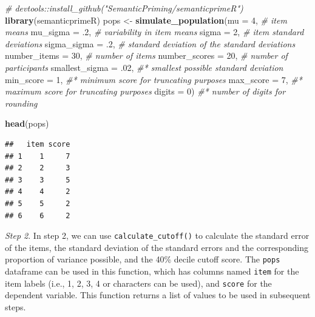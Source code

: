 \documentclass[
  man]{apa7}
\newenvironment{Shaded}{\begin{snugshade}}{\end{snugshade}}
\newcommand{\AttributeTok}[1]{\textcolor[rgb]{0.13,0.29,0.53}{#1}}
\newcommand{\CommentTok}[1]{\textcolor[rgb]{0.56,0.35,0.01}{\textit{#1}}}
\newcommand{\DecValTok}[1]{\textcolor[rgb]{0.00,0.00,0.81}{#1}}
\newcommand{\FunctionTok}[1]{\textcolor[rgb]{0.13,0.29,0.53}{\textbf{#1}}}
\newcommand{\NormalTok}[1]{#1}
\newcommand{\OtherTok}[1]{\textcolor[rgb]{0.56,0.35,0.01}{#1}}
\begin{document}
\begin{Shaded}
\begin{Highlighting}[]
\CommentTok{\# devtools::install\_github("SemanticPriming/semanticprimeR")}
\FunctionTok{library}\NormalTok{(semanticprimeR)}
\NormalTok{pops }\OtherTok{\textless{}{-}} \FunctionTok{simulate\_population}\NormalTok{(}\AttributeTok{mu =} \DecValTok{4}\NormalTok{, }\CommentTok{\# item means}
  \AttributeTok{mu\_sigma =}\NormalTok{ .}\DecValTok{2}\NormalTok{, }\CommentTok{\# variability in item means }
  \AttributeTok{sigma =} \DecValTok{2}\NormalTok{, }\CommentTok{\# item standard deviations}
  \AttributeTok{sigma\_sigma =}\NormalTok{ .}\DecValTok{2}\NormalTok{, }\CommentTok{\# standard deviation of the standard deviations}
  \AttributeTok{number\_items =} \DecValTok{30}\NormalTok{, }\CommentTok{\# number of items}
  \AttributeTok{number\_scores =} \DecValTok{20}\NormalTok{, }\CommentTok{\# number of participants}
  \AttributeTok{smallest\_sigma =}\NormalTok{ .}\DecValTok{02}\NormalTok{, }\CommentTok{\#* smallest possible standard deviation}
  \AttributeTok{min\_score =} \DecValTok{1}\NormalTok{, }\CommentTok{\#* minimum score for truncating purposes}
  \AttributeTok{max\_score =} \DecValTok{7}\NormalTok{, }\CommentTok{\#* maximum score for truncating purposes}
  \AttributeTok{digits =} \DecValTok{0}\NormalTok{) }\CommentTok{\#* number of digits for rounding}
  
\FunctionTok{head}\NormalTok{(pops)}
\end{Highlighting}
\end{Shaded}

\begin{verbatim}
##   item score
## 1    1     7
## 2    2     3
## 3    3     5
## 4    4     2
## 5    5     2
## 6    6     2
\end{verbatim}

\emph{Step 2}. In step 2, we can use \texttt{calculate\_cutoff()} to calculate the standard error of the items, the standard deviation of the standard errors and the corresponding proportion of variance possible, and the 40\% decile cutoff score. The \texttt{pops} dataframe can be used in this function, which has columns named \texttt{item} for the item labels (i.e., 1, 2, 3, 4 or characters can be used), and \texttt{score} for the dependent variable. This function returns a list of values to be used in subsequent steps.
\end{document}

